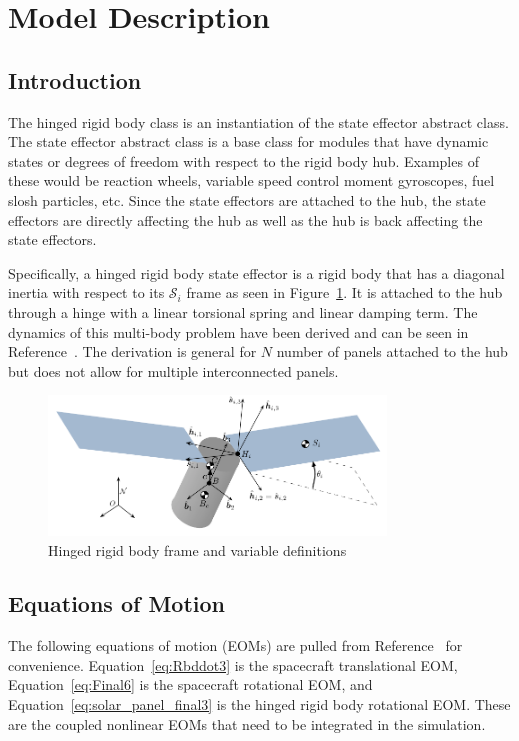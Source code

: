 \section{Model Description}

\subsection{Introduction}

The hinged rigid body class is an instantiation of the state effector abstract class. The state effector abstract class is a base class for modules that have dynamic states or degrees of freedom with respect to the rigid body hub. Examples of these would be reaction wheels, variable speed control moment gyroscopes, fuel slosh particles, etc. Since the state effectors are attached to the hub, the state effectors are directly affecting the hub as well as the hub is back affecting the state effectors.

Specifically, a hinged rigid body state effector is a rigid body that has a diagonal inertia with respect to its $\mathcal{S}_i$ frame as seen in Figure~\ref{fig:FlexFigure}. It is attached to the hub through a hinge with a linear torsional spring and linear damping term. The dynamics of this multi-body problem have been derived and can be seen in Reference~\cite{Allard2016rz}. The derivation is general for $N$ number of panels attached to the hub but does not allow for multiple interconnected panels. 

\begin{figure}[htbp]
	\centerline{
		\includegraphics[width=0.8\textwidth]{Figures/Fig4_4_2}}
	\caption{Hinged rigid body frame and variable definitions}
	\label{fig:FlexFigure}
\end{figure}

\subsection{Equations of Motion}

The following equations of motion (EOMs) are pulled from Reference~ for convenience. Equation~\eqref{eq:Rbddot3} is the spacecraft translational EOM, Equation~\eqref{eq:Final6} is the spacecraft rotational EOM, and Equation~\eqref{eq:solar_panel_final3} is the hinged rigid body rotational EOM. These are the coupled nonlinear EOMs that need to be integrated in the simulation. 

